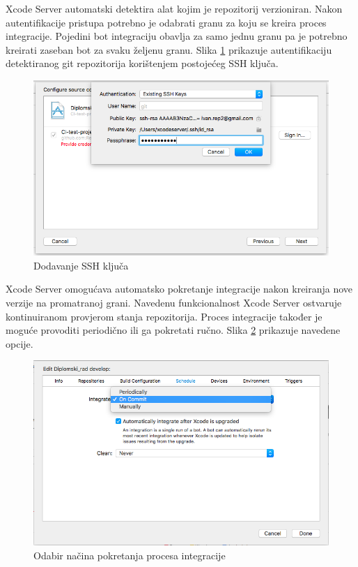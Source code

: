 \documentclass[times, utf8, diplomski, numeric]{fer}
\begin{document}
Xcode Server automatski detektira alat kojim je repozitorij verzioniran. Nakon autentifikacije pristupa potrebno je odabrati granu za koju se kreira proces integracije. Pojedini bot integraciju obavlja za samo jednu granu pa je potrebno kreirati zaseban bot za svaku željenu granu. Slika \ref{fig:BotAddingSSH} prikazuje autentifikaciju detektiranog git repozitorija korištenjem postojećeg SSH ključa.

\begin{figure}
\centering
\includegraphics[scale=0.5]{BotAddingSSH}
\caption{Dodavanje SSH ključa}
\label{fig:BotAddingSSH}
\end{figure}

Xcode Server omogućava automatsko pokretanje integracije nakon kreiranja nove verzije na promatranoj grani. Navedenu funkcionalnost Xcode Server ostvaruje kontinuiranom provjerom stanja repozitorija. Proces integracije također je moguće provoditi periodično ili ga pokretati ručno. Slika \ref{fig:CIStartConfig} prikazuje navedene opcije.

\begin{figure}[b!]
\centering
\includegraphics[scale=0.5]{CIStartConfig}
\caption{Odabir načina pokretanja procesa integracije}
\label{fig:CIStartConfig}
\end{figure}
\end{document}
